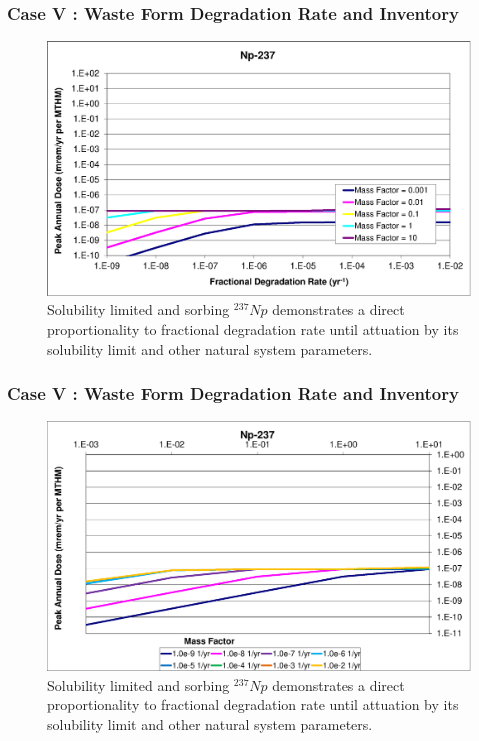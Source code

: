 \begin{frame}[c]
  \frametitle{Case V : Waste Form Degradation Rate and Inventory}

\begin{figure}[ht!]
\centering
\includegraphics[width=\linewidth]{WFDegAndInv/Np-237.eps}
\caption{
  Solubility limited and sorbing $^{237}Np$ demonstrates a direct proportionality 
to fractional degradation rate until attuation by its solubility limit and other 
natural system parameters. } 
\label{fig:WFDegNp237}
\end{figure}
\end{frame}

\begin{frame}[c]
  \frametitle{Case V : Waste Form Degradation Rate and Inventory}

\begin{figure}[ht!]
\centering
\includegraphics[width=\linewidth]{WFDegAndInv/Np-237-MF.eps}
\caption{
  Solubility limited and sorbing $^{237}Np$ demonstrates a direct proportionality 
to fractional degradation rate until attuation by its solubility limit and other 
natural system parameters. } 
\label{fig:WFDegNp237MF}
\end{figure}

\end{frame}

